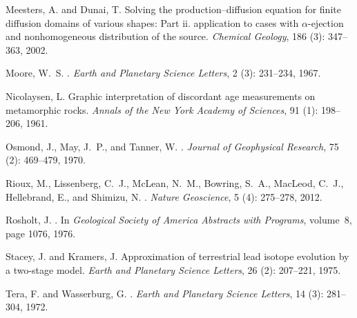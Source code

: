 \documentclass{article}
\begin{document}
\begin{thebibliography}{78}
Meesters, A. and Dunai, T.
\newblock Solving the production--diffusion equation for finite diffusion
  domains of various shapes: Part ii. application to cases with
  $\alpha$-ejection and nonhomogeneous distribution of the source.
\newblock \emph{Chemical Geology}, 186 (3): 347--363, 2002.

Moore, W.~S.
.
\newblock \emph{Earth and Planetary Science Letters}, 2 (3):
  231--234, 1967.

Nicolaysen, L.
\newblock Graphic interpretation of discordant age measurements on metamorphic
  rocks.
\newblock \emph{Annals of the New York Academy of Sciences}, 91
  (1): 198--206, 1961.

Osmond, J., May, J.~P., and Tanner, W.
.
\newblock \emph{Journal of Geophysical Research}, 75 (2):
  469--479, 1970.

Rioux, M., Lissenberg, C.~J., McLean, N.~M., Bowring, S.~A., MacLeod, C.~J.,
  Hellebrand, E., and Shimizu, N.
.
\newblock \emph{Nature Geoscience}, 5 (4): 275--278, 2012.

Rosholt, J.
.
\newblock In \emph{Geological Society of America Abstracts with Programs},
  volume~8, page 1076, 1976.

Stacey, J. and Kramers, J.
\newblock Approximation of terrestrial lead isotope evolution by a two-stage
  model.
\newblock \emph{Earth and Planetary Science Letters}, 26 (2):
  207--221, 1975.

Tera, F. and Wasserburg, G.
.
\newblock \emph{Earth and Planetary Science Letters}, 14 (3):
  281--304, 1972.


\end{thebibliography}
\end{document}
